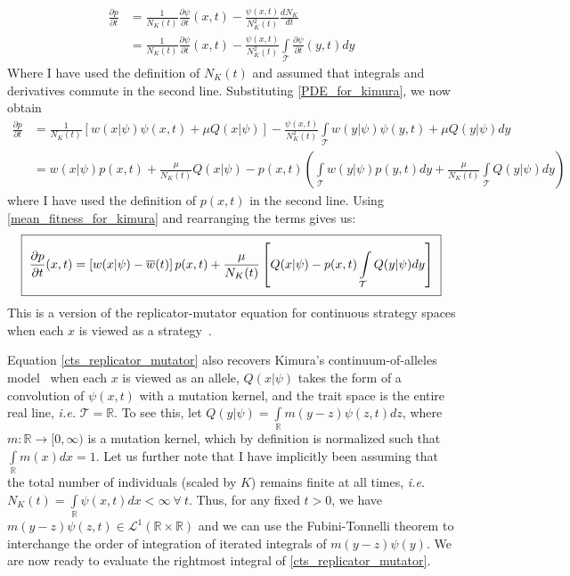 \begin{align*}
\frac{\partial p}{\partial t} &= \frac{1}{N_K(t)}\frac{\partial \psi}{\partial t}(x,t) - \frac{\psi(x,t)}{N^2_K(t)}\frac{d N_K}{dt}\\
&= \frac{1}{N_K(t)}\frac{\partial \psi}{\partial t}(x,t) - \frac{\psi(x,t)}{N^2_K(t)}\int\limits_{\mathcal{T}}\frac{\partial \psi}{\partial t}(y,t)dy
\end{align*}
Where I have used the definition of $N_K(t)$ and assumed that integrals and derivatives commute in the second line. Substituting \eqref{PDE_for_kimura}, we now obtain
\begin{align*}
\frac{\partial p}{\partial t} &= \frac{1}{N_K(t)}\left[w(x|\psi)\psi(x,t) + \mu Q(x|\psi)\right] - \frac{\psi(x,t)}{N^2_K(t)}\int\limits_{\mathcal{T}}w(y|\psi)\psi(y,t) + \mu Q(y|\psi)dy\\
&= w(x|\psi)p(x,t) + \frac{\mu}{N_{K}(t)} Q(x|\psi) - p(x,t)\left(\int\limits_{\mathcal{T}}w(y|\psi)p(y,t)dy+\frac{\mu}{N_K(t)}\int\limits_{\mathcal{T}} Q(y|\psi)dy\right)
\end{align*}
where I have used the definition of $p(x,t)$ in the second line. Using \eqref{mean_fitness_for_kimura} and rearranging the terms gives us:
\begin{equation}
\label{cts_replicator_mutator}
\setlength{\fboxsep}{2\fboxsep}\boxed{\frac{\partial p}{\partial t}(x,t) = \left[w(x|\psi) - \overline{w}(t)\right]p(x,t)+\frac{\mu}{N_K(t)}\left[Q(x|\psi) - p(x,t)\int\limits_{\mathcal{T}} Q(y|\psi)dy\right]}
\end{equation}
This is a version of the replicator-mutator equation for continuous strategy spaces when each $x$ is viewed as a strategy~\citep{cressman_replicator_2014}.

Equation \eqref{cts_replicator_mutator} also recovers Kimura's continuum-of-alleles model~\citep{kimura_stochastic_1965} when each $x$ is viewed as an allele, $Q(x|\psi)$ takes the form of a convolution of $\psi(x,t)$ with a mutation kernel, and the trait space is the entire real line, \emph{i.e.} $\mathcal{T} = \mathbb{R}$. To see this, let $Q(y|\psi) = \int\limits_{\mathbb{R}}m(y-z)\psi(z,t)dz$, where $m:\mathbb{R} \to [0,\infty)$ is a mutation kernel, which by definition is normalized such that $\int\limits_{\mathbb{R}}m(x)dx = 1$. Let us further note that I have implicitly been assuming that the total number of individuals (scaled by $K$) remains finite at all times, \emph{i.e.} $N_K(t) = \int\limits_{\mathbb
R}\psi(x,t)dx < \infty \ \forall \ t$. Thus, for any fixed $t > 0$, we have $m(y-z)\psi(z,t) \in  \mathcal{L}^{1}(\mathbb{R}\times\mathbb{R})$ and we can use the Fubini-Tonnelli theorem to interchange the order of integration of iterated integrals of $m(y-z)\psi(y)$. We are now ready to evaluate the rightmost integral of \eqref{cts_replicator_mutator}.


